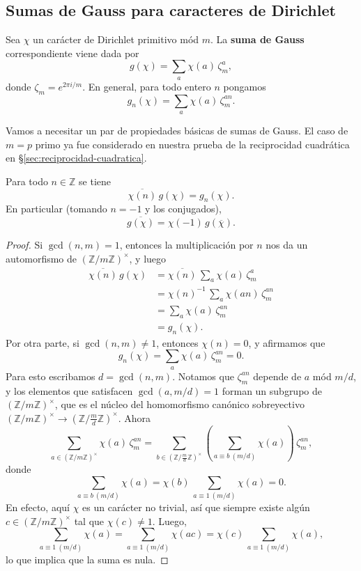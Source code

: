 \subsection{Sumas de Gauss para caracteres de Dirichlet}

\begin{definicion}
  Sea $\chi$ un carácter de Dirichlet primitivo mód $m$.
  La \textbf{suma de Gauss} correspondiente viene dada por
  $$g (\chi) = \sum_a \chi (a) \, \zeta_m^a,$$
  donde $\zeta_m = e^{2\pi i/m}$. En general, para todo entero $n$ pongamos
  $$g_n (\chi) = \sum_a \chi (a) \, \zeta_m^{an}.$$
\end{definicion}

Vamos a necesitar un par de propiedades básicas de sumas de Gauss. El caso de
$m = p$ primo ya fue considerado en nuestra prueba de la reciprocidad cuadrática
en \S\ref{sec:reciprocidad-cuadratica}.

\begin{lema}
  \label{lema:sumas-de-Gauss-1}
  Para todo $n \in \mathbb{Z}$ se tiene
  $$\overline{\chi (n)} \, g (\chi) = g_n (\chi).$$
  En particular (tomando $n = -1$ y los conjugados),
  $$\overline{g (\chi)} = \chi (-1)\,g (\overline{\chi}).$$

  \begin{proof}
    Si $\gcd (n,m) = 1$, entonces la multiplicación por $n$ nos da
    un automorfismo de $(\mathbb{Z}/m\mathbb{Z})^\times$, y luego
    \begin{align*}
      \overline{\chi (n)} \, g (\chi) & = \overline{\chi (n)}\,\sum_a \chi (a) \, \zeta_m^a\\
      & = \chi (n)^{-1}\,\sum_a \chi (an) \, \zeta_m^{an}\\
      & = \sum_a \chi (a) \, \zeta_m^{an} \\
      & = g_n (\chi).
    \end{align*}
    Por otra parte, si $\gcd (n,m) \ne 1$, entonces $\chi (n) = 0$,
    y afirmamos que
    $$g_n (\chi) = \sum_a \chi (a) \, \zeta_m^{an} = 0.$$
    Para esto escribamos $d = \gcd (n,m)$. Notamos que $\zeta_m^{an}$ depende
    de $a$ mód $m/d$, y los elementos que satisfacen $\gcd (a,m/d) = 1$ forman
    un subgrupo de $(\mathbb{Z}/m\mathbb{Z})^\times$, que es el núcleo del
    homomorfismo canónico sobreyectivo
    $(\mathbb{Z}/m\mathbb{Z})^\times \to (\mathbb{Z}/\frac{m}{d}\mathbb{Z})^\times$.
    Ahora
    $$\sum_{a \in (\mathbb{Z}/m\mathbb{Z})^\times} \chi (a) \, \zeta_m^{an} = \sum_{b \in (\mathbb{Z}/\frac{m}{d}\mathbb{Z})^\times} \left(\sum_{a \equiv b ~ (m/d)} \chi (a)\right)\,\zeta_m^{an},$$
    donde
    $$\sum_{a \equiv b ~ (m/d)} \chi (a) = \chi (b) \, \sum_{a \equiv 1 ~ (m/d)} \chi (a) = 0.$$
    En efecto, aquí $\chi$ es un carácter no trivial, así que siempre existe
    algún $c \in (\mathbb{Z}/m\mathbb{Z})^\times$ tal que
    $\chi (c) \ne 1$. Luego,
    $$\sum_{a \equiv 1 ~ (m/d)} \chi (a) = \sum_{a \equiv 1 ~ (m/d)} \chi (ac) = \chi (c)\,\sum_{a \equiv 1 ~ (m/d)} \chi (a),$$
    lo que implica que la suma es nula.
  \end{proof}
\end{lema}

